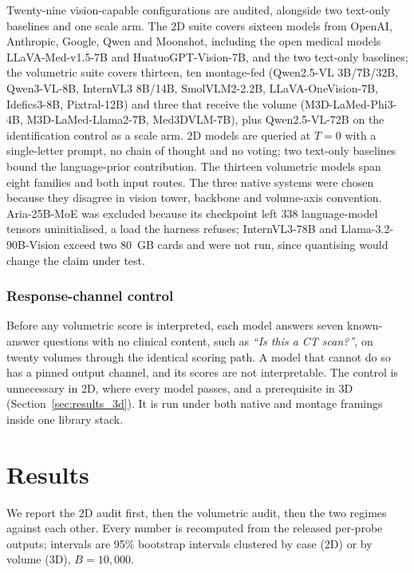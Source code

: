 Twenty-nine vision-capable configurations are audited, alongside two
text-only baselines and one scale arm. The 2D suite covers sixteen models
from OpenAI, Anthropic, Google, Qwen and Moonshot, including the open
medical models LLaVA-Med-v1.5-7B and HuatuoGPT-Vision-7B, and the two
text-only baselines; the volumetric suite covers thirteen, ten montage-fed
(Qwen2.5-VL 3B/7B/32B, Qwen3-VL-8B, InternVL3 8B/14B, SmolVLM2-2.2B,
LLaVA-OneVision-7B, Idefics3-8B, Pixtral-12B) and three that receive the
volume (M3D-LaMed-Phi3-4B, M3D-LaMed-Llama2-7B, Med3DVLM-7B), plus
Qwen2.5-VL-72B on the identification control as a scale arm. 2D models are queried
at $T=0$ with a single-letter prompt, no chain of thought and no voting; two
text-only baselines bound the language-prior contribution. The thirteen
volumetric models span eight families and both input routes. The three
native systems were chosen because they disagree in vision tower, backbone
and volume-axis convention. Aria-25B-MoE was excluded because its
checkpoint left 338 language-model tensors uninitialised, a load the harness
refuses; InternVL3-78B and Llama-3.2-90B-Vision exceed two 80~GB cards and
were not run, since quantising would change the claim under test.

\subsubsection{Response-channel control} Before any volumetric score is
interpreted, each model answers seven known-answer questions with no clinical
content, such as \emph{``Is this a CT scan?''}, on twenty volumes through
the identical scoring path. A model that cannot do so has a pinned output
channel, and its scores are not interpretable. The control is unnecessary in
2D, where every model passes, and a prerequisite in 3D
(Section~\ref{sec:results_3d}). It is run under both native and montage
framings inside one library stack.

\section{Results}
\label{sec:results}

We report the 2D audit first, then the volumetric audit, then the two
regimes against each other. Every number is recomputed from the released
per-probe outputs; intervals are 95\% bootstrap intervals clustered by case
(2D) or by volume (3D), $B=10{,}000$.

